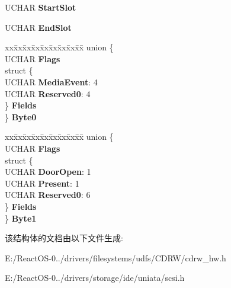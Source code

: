 \begin{DoxyCompactItemize}
\begin{tabbing}
\end{tabbing}\item 
\mbox{\label{struct___e_v_e_n_t___s_t_a_t___m_e_d_i_a___b_l_o_c_k_a9ed2b87bd11ac93c30222a8d42773806}} 
U\+C\+H\+AR {\bfseries Start\+Slot}
\item 
\mbox{\label{struct___e_v_e_n_t___s_t_a_t___m_e_d_i_a___b_l_o_c_k_a8d18648f59a88cfcb1297bd033890ac4}} 
U\+C\+H\+AR {\bfseries End\+Slot}
\item 
\mbox{\label{struct___e_v_e_n_t___s_t_a_t___m_e_d_i_a___b_l_o_c_k_acf9897a251674378b295069e1d370586}} 
\begin{tabbing}
xx\=xx\=xx\=xx\=xx\=xx\=xx\=xx\=xx\=\kill
union \{\\
\>UCHAR {\bfseries Flags}\\
\>struct \{\\
\>\>UCHAR {\bfseries MediaEvent}: 4\\
\>\>UCHAR {\bfseries Reserved0}: 4\\
\>\} {\bfseries Fields}\\
\} {\bfseries Byte0}\\

\end{tabbing}\item 
\mbox{\label{struct___e_v_e_n_t___s_t_a_t___m_e_d_i_a___b_l_o_c_k_a5a7fdd17b35fe6b938b1caff77097b71}} 
\begin{tabbing}
xx\=xx\=xx\=xx\=xx\=xx\=xx\=xx\=xx\=\kill
union \{\\
\>UCHAR {\bfseries Flags}\\
\>struct \{\\
\>\>UCHAR {\bfseries DoorOpen}: 1\\
\>\>UCHAR {\bfseries Present}: 1\\
\>\>UCHAR {\bfseries Reserved0}: 6\\
\>\} {\bfseries Fields}\\
\} {\bfseries Byte1}\\

\end{tabbing}\end{DoxyCompactItemize}


该结构体的文档由以下文件生成\+:\begin{DoxyCompactItemize}
\item 
E\+:/\+React\+O\+S-\/0../drivers/filesystems/udfs/\+C\+D\+R\+W/cdrw\+\_\+hw.\+h\item 
E\+:/\+React\+O\+S-\/0../drivers/storage/ide/uniata/scsi.\+h\end{DoxyCompactItemize}
